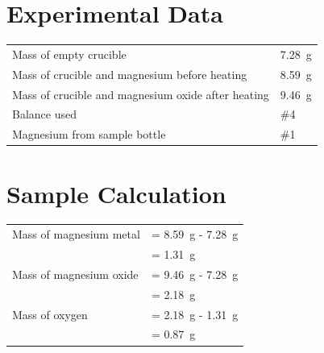 \documentclass{article}
\begin{document}
	
	\section{Experimental Data}
	
	\begin{tabular}{ll}
		Mass of empty crucible & \SI{7.28}{\gram}\\
		Mass of crucible and magnesium before heating & \SI{8.59}{\gram}\\
		Mass of crucible and magnesium oxide after heating & \SI{9.46}{\gram}\\
		Balance used & \#4\\
		Magnesium from sample bottle & \#1
	\end{tabular}
	
	
	\section{Sample Calculation}
	
	\begin{tabular}{ll}
		Mass of magnesium metal & = \SI{8.59}{\gram} - \SI{7.28}{\gram}\\
		& = \SI{1.31}{\gram}\\
		Mass of magnesium oxide & = \SI{9.46}{\gram} - \SI{7.28}{\gram}\\
		& = \SI{2.18}{\gram}\\
		Mass of oxygen & = \SI{2.18}{\gram} - \SI{1.31}{\gram}\\
		& = \SI{0.87}{\gram}
	\end{tabular}
	
	
	
\end{document}
